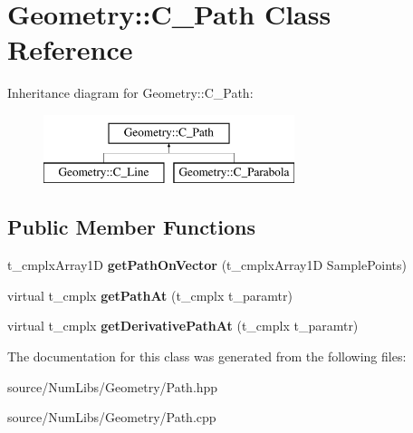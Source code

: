 \hypertarget{class_geometry_1_1_c___path}{\section{Geometry\-:\-:C\-\_\-\-Path Class Reference}
\label{class_geometry_1_1_c___path}
}
Inheritance diagram for Geometry\-:\-:C\-\_\-\-Path\-:\begin{figure}[H]
\begin{center}
\leavevmode
\includegraphics[height=2.000000cm]{class_geometry_1_1_c___path}
\end{center}
\end{figure}
\subsection*{Public Member Functions}
\begin{DoxyCompactItemize}
\item 
\hypertarget{class_geometry_1_1_c___path_a3e09ce3608385b63ebbe9ffad0f0599b}{t\-\_\-cmplx\-Array1\-D {\bfseries get\-Path\-On\-Vector} (t\-\_\-cmplx\-Array1\-D Sample\-Points)}\label{class_geometry_1_1_c___path_a3e09ce3608385b63ebbe9ffad0f0599b}

\item 
\hypertarget{class_geometry_1_1_c___path_a133c937a36b957116043fddfe3fedf46}{virtual t\-\_\-cmplx {\bfseries get\-Path\-At} (t\-\_\-cmplx t\-\_\-paramtr)}\label{class_geometry_1_1_c___path_a133c937a36b957116043fddfe3fedf46}

\item 
\hypertarget{class_geometry_1_1_c___path_a62acb86d6a96d7f0a3185fb498ec449d}{virtual t\-\_\-cmplx {\bfseries get\-Derivative\-Path\-At} (t\-\_\-cmplx t\-\_\-paramtr)}\label{class_geometry_1_1_c___path_a62acb86d6a96d7f0a3185fb498ec449d}

\end{DoxyCompactItemize}


The documentation for this class was generated from the following files\-:\begin{DoxyCompactItemize}
\item 
source/\-Num\-Libs/\-Geometry/Path.\-hpp\item 
source/\-Num\-Libs/\-Geometry/Path.\-cpp\end{DoxyCompactItemize}
